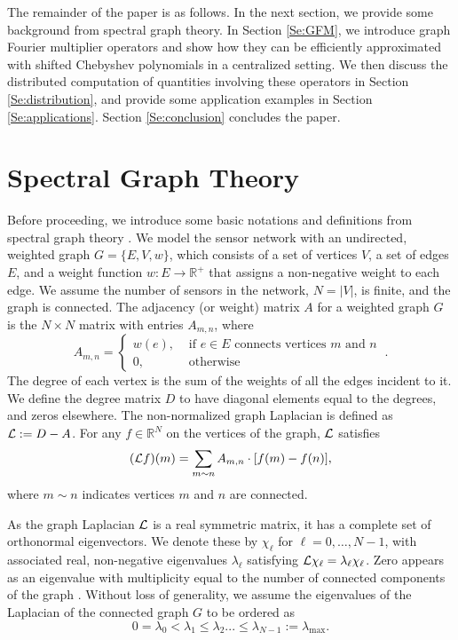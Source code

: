 \documentclass[conference]{IEEEtran}
\renewcommand{\l}{\ell}
\renewcommand{\L}{{\mathcal{L}}}
\def\L{{\cal L}}
\begin{document}
The remainder of the paper is as follows. In the next section, we provide some background from
spectral graph theory. In Section \ref{Se:GFM}, we introduce graph Fourier multiplier operators and show how they can be efficiently approximated with shifted Chebyshev polynomials in a centralized setting. We then discuss the distributed computation of quantities involving these operators in Section \ref{Se:distribution}, and provide some application examples in Section \ref{Se:applications}. Section \ref{Se:conclusion} concludes the paper.








\section{Spectral Graph Theory} \label{Se:SGT}
Before proceeding, we introduce some basic notations and definitions from spectral graph theory \cite{chung}. We model the sensor network with an undirected, weighted graph $G = \{E,V,w\}$, which consists of a set of vertices $V$, a
set of edges $E$, and a weight function $w:E\to\mathbb{R}^+$ that assigns a
non-negative weight to each edge. We assume the number of sensors in the network, $N=|V|$, is finite, and the graph is connected. The adjacency (or weight) matrix $A$ for a weighted graph $G$ is the $N\times N$ matrix with entries $A_{m,n}$, where
\begin{equation*}
A_{m,n} =
\begin{cases}
w(e), &\mbox{ if $e\in E$ connects vertices $m$ and $n$} \\
0, &\mbox{ otherwise}
\end{cases}~.
\end{equation*}
The degree of each vertex is the sum of the weights of all the edges incident
to it. We define the degree matrix $D$
to have diagonal elements equal to the degrees, and zeros elsewhere.
The non-normalized graph Laplacian is defined as $\L:=D-A$. For any $f\in \mathbb{R}^N$ on the vertices of the graph, $\L$ satisfies
\begin{equation*}
(\L f)(m) = \sum_{m\sim n} A_{m,n} \cdot [f(m) - f(n)],
\end{equation*}
where $m\sim n$ indicates vertices $m$ and $n$ are connected. 

As the graph Laplacian $\L$ is a real symmetric
matrix, it has a complete set of orthonormal eigenvectors. We denote
these by $\chi_{\l}$ for $\l=0, \hdots ,N-1$, with associated real, non-negative eigenvalues
$\lambda_{\l}$ satisfying $\L \chi_{\l} = \lambda_{\l} \chi_{\l}$.
Zero appears as an eigenvalue with multiplicity equal to the
number of connected components of the graph
\cite{chung}.
Without loss of generality, we assume the eigenvalues of the Laplacian of the connected graph $G$ to be ordered as
\begin{equation*}
0=\lambda_0 < \lambda_1 \leq \lambda_2 ... \leq \lambda_{N-1}:=\lambda_{\max}.
\end{equation*}
\end{document}
